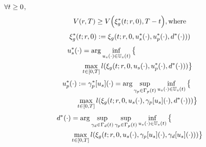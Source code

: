 \begin{prop}
  \label{prop:nonconv}
  $\forall t \ge 0$,
  \begin{equation}
  \label{eq:invariant_nonconv}
  \valfunc(\rstate,\thor) \ge \valfunc\Big(\rtraj^*(\tvar; \rstate, 0), \thor - \tvar \Big), \text{where}
  \end{equation}
  \begin{equation}
  \begin{aligned}
  \xi_g^*(t; r, 0) := \xi_g(t; r, 0, u_s^*(\cdot), u_p^*(\cdot), d^*(\cdot))) \\
  \end{aligned}
  \end{equation}
  \begin{equation}
  \begin{aligned}
  &u_s^*(\cdot) = \arg \inf_{u_s(\cdot)\in\mathbb{U}_s(t)}\big\{\\
  & \qquad \max_{t \in [0, T]} l(\xi_g(t; r, 0, u_s(\cdot), u_p^*(\cdot), d^*(\cdot))) \big\}\\
  \end{aligned}
  \end{equation}
  \begin{equation}
  \begin{aligned}
  & u_p^*(\cdot) := \gamma_p^*[u_s](\cdot) = \arg \sup_{\gamma_{p} \in \Gamma_p(t)} \inf_{u_s(\cdot) \in \mathbb{U}_s(t)} \big\{ \\
  & \qquad \max_{t \in [0, T]} l(\xi_g(t; r, 0, u_s(\cdot), \gamma_p[u_s](\cdot), d^*(\cdot))) \big\} \\
  \end{aligned}
  \end{equation}
  \begin{equation}
  \begin{aligned}
  & d^*(\cdot) = \arg \sup_{\gamma_{d} \in \Gamma_d(t)} \sup_{\gamma_{p} \in \Gamma_p(t)} \inf_{u_s(\cdot) \in \mathbb{U}_s(t)} \big\{\\
  & \qquad \max_{t \in [0, T]} l(\xi_g(t; r, 0, u_s(\cdot), \gamma_p[u_s](\cdot), \gamma_d[u_s](\cdot))) \big\}
  \end{aligned}
  \end{equation}
\end{prop}


